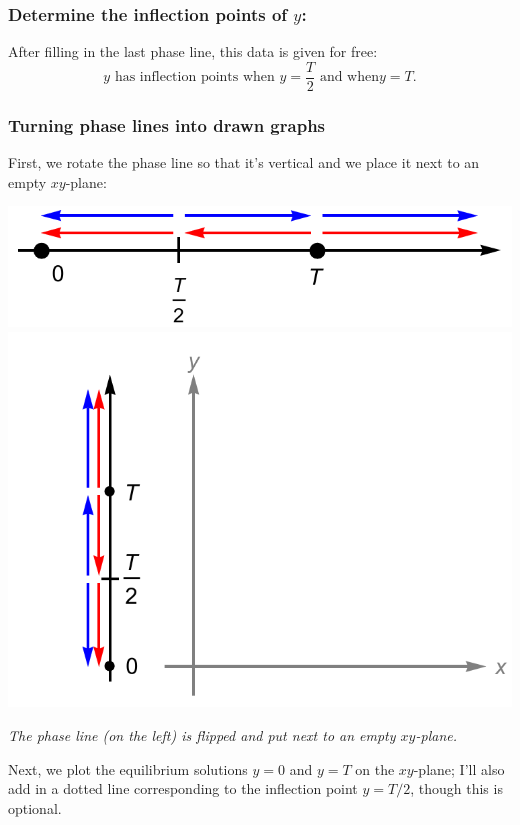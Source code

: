\documentclass[12pt]{article}
\theoremstyle{definition}
\theoremstyle{underl}
\newcommand{\capt}[1]{\begin{adjustwidth}{0.5in}{0.5in}\centering\small\textit{#1}\end{adjustwidth}}
\begin{document}
	\subsubsection*{Determine the inflection points of $y$:}\par
	After filling in the last phase line, this data is given for free:
	$$y\text{ has inflection points when }y=\frac{T}{2}\text{ and when}y=T.$$
	
	\subsubsection*{Turning phase lines into drawn graphs}
	First, we rotate the phase line so that it's vertical and we place it next to an empty $xy$-plane:
	\vspace{-6mm}
	\begin{center}
		\includegraphics[align=c,scale=0.5]{Ex1_Phase_4}
		\includegraphics[align=c,scale=0.875]{Ex1_xy_1}
		\vspace{1.5mm}
		\capt{The phase line (on the left) is flipped and put next to an empty $xy$-plane.}
	\end{center}
	Next, we plot the equilibrium solutions $y=0$ and $y=T$ on the $xy$-plane; I'll also add in a dotted line corresponding to the inflection point $y=T/2$, though this is optional.
\end{document}
